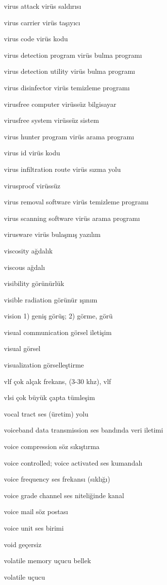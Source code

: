 \documentclass[12pt,fleqn]{article}\usepackage{../../common}
\begin{document}
virus attack virüs saldırısı

virus carrier virüs taşıyıcı

virus code virüs kodu

virus detection program virüs bulma programı

virus detection utility virüs bulma programı

virus disinfector virüs temizleme programı

virusfree computer virüssüz bilgisayar

virusfree system virüssüz sistem

virus hunter program virüs arama programı

virus id virüs kodu

virus infiltration route virüs sızma yolu

virusproof virüssüz

virus removal software virüs temizleme programı

virus scanning software virüs arama programı

virusware virüs bulaşmış yazılım

viscosity ağdalık

viscous ağdalı

visibility görünürlük

visible radiation görünür ışınım

vision 1) geniş görüş; 2) görme, görü

visual communication görsel iletişim

visual görsel

visualization görselleştirme

vlf çok alçak frekans, (3-30 khz), vlf

vlsi çok büyük çapta tümleşim

vocal tract ses (üretim) yolu

voiceband data transmission ses bandında veri iletimi

voice compression söz sıkıştırma

voice controlled; voice activated ses kumandalı

voice frequency ses frekansı (sıklığı)

voice grade channel ses niteliğinde kanal

voice mail söz postası

voice unit ses birimi

void geçersiz

volatile memory uçucu bellek

volatile uçucu
\end{document}
